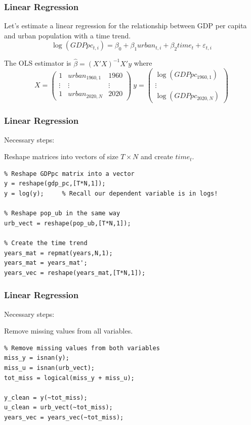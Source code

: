 \documentclass[11pt,xcolor={svgnames},aspectratio=169,usepdftitle=false]{beamer}
\let\toneitemize\itemize
\let\ttwoitemize\enditemize
\renewenvironment{itemize}{\toneitemize\addtolength{\itemsep}{0.7\baselineskip}}{\ttwoitemize}
\let\toneenumer\enumerate
\let\ttwoenumer\endenumerate
\renewenvironment{enumerate}{\toneenumer\addtolength{\itemsep}{0.7\baselineskip}}{\ttwoenumer}
\begin{document}
\begin{frame}[fragile]
  \frametitle{Linear Regression}
\begin{itemize}
  \item Let's estimate a linear regression for the relationship between GDP per capita and urban population with a time trend.
  \[
  \log(GDPpc_{t,i}) = \beta_0 + \beta_1 urban_{t,i} + \beta_2 time_t + \varepsilon_{t,i}
  \]
  \item The OLS estimator is $\hat{\beta} = (X'X)^{-1}X'y$ where
  \[
  X = \begin{pmatrix}
    1 & urban_{1960,1} & 1960 \\
    \vdots & \vdots & \vdots \\
    1 & urban_{2020,N} & 2020 
  \end{pmatrix}  \ 
  y = \begin{pmatrix}
    \log(GDPpc_{1960,1}) \\
    \vdots \\
    \log(GDPpc_{2020,N})
  \end{pmatrix}
  \]
\end{itemize}
\end{frame}

\begin{frame}[fragile]
  \frametitle{Linear Regression}
Necessary steps:
\begin{enumerate}
  \item Reshape matrices into vectors of size $T\times N$ and create $time_t$.
\end{enumerate}
\begin{lstlisting}
% Reshape GDPpc matrix into a vector
y = reshape(gdp_pc,[T*N,1]);
y = log(y);     % Recall our dependent variable is in logs!

% Reshape pop_ub in the same way
urb_vect = reshape(pop_ub,[T*N,1]);

% Create the time trend
years_mat = repmat(years,N,1);
years_mat = years_mat';
years_vec = reshape(years_mat,[T*N,1]);
\end{lstlisting}
\end{frame}

\begin{frame}[fragile]
  \frametitle{Linear Regression}
Necessary steps:
\begin{enumerate}
  \setcounter{enumi}{1}
  \item Remove missing values from all variables.
\end{enumerate}
\begin{lstlisting}
% Remove missing values from both variables
miss_y = isnan(y);
miss_u = isnan(urb_vect);
tot_miss = logical(miss_y + miss_u);

y_clean = y(~tot_miss);
u_clean = urb_vect(~tot_miss);
years_vec = years_vec(~tot_miss);
\end{lstlisting}
\end{frame}
\end{document}
